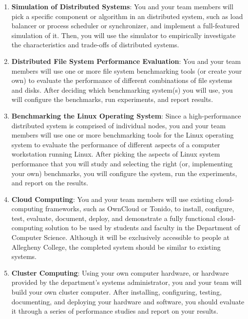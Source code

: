 \begin{enumerate}

  \item {\bf Simulation of Distributed Systems}: You and your team members will pick a specific component or algorithm
    in an distributed system, such as load balancer or process scheduler or synchronizer, and implement a full-featured
    simulation of it.  Then, you will use the simulator to empirically investigate the characteristics and trade-offs of
    distributed systems.

  \item {\bf Distributed File System Performance Evaluation}: You and your team members will use one or more file system
    benchmarking tools (or create your own) to evaluate the performance of different combinations of file systems and
    disks.  After deciding which benchmarking system(s) you will use, you will configure the benchmarks, run
    experiments, and report results.

  \item {\bf Benchmarking the Linux Operating System}: Since a high-performance distributed system is comprised of
    individual nodes, you and your team members will use one or more benchmarking tools for the Linux operating system
    to evaluate the performance of different aspects of a computer workstation running Linux.  After picking the aspects
    of Linux system performance that you will study and selecting the right (or, implementing your own) benchmarks, you
    will configure the system, run the experiments, and report on the results.

  \item {\bf Cloud Computing}: You and your team members will use existing cloud-computing frameworks, such as OwnCloud
    or Tonido, to install, configure, test, evaluate, document, deploy, and demonstrate a fully functional
    cloud-computing solution to be used by students and faculty in the Department of Computer Science. Although it will
    be exclusively accessible to people at Allegheny College, the completed system should be similar to existing
    systems.

  \item {\bf Cluster Computing}: Using your own computer hardware, or hardware provided by the department's systems
    administrator, you and your team will build your own cluster computer.  After installing, configuring, testing,
    documenting, and deploying your hardware and software, you should evaluate it through a series of performance
    studies and report on your results.


\end{enumerate}
